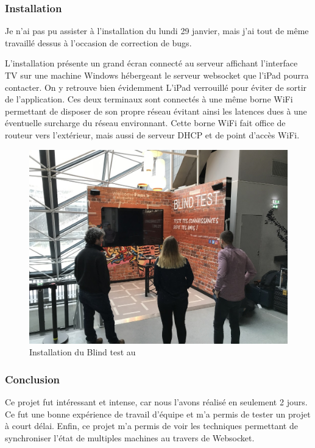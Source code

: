 \subsubsection{Installation}

Je n'ai pas pu assister à l'installation du lundi 29 janvier, mais j'ai tout de même travaillé dessus à l'occasion de correction de bugs.

L'installation présente un grand écran connecté au serveur affichant l'interface TV sur une machine Windows hébergeant le serveur websocket que l'iPad pourra contacter.
On y retrouve bien évidemment L'iPad verrouillé pour éviter de sortir de l'application.
Ces deux terminaux sont connectés à une même borne WiFi permettant de disposer de son propre réseau évitant ainsi les latences dues à une éventuelle surcharge du réseau environnant.
Cette borne WiFi fait office de routeur vers l'extérieur, mais aussi de serveur DHCP et de point d'accès WiFi.

\begin{figure}[h]
    \centering
    \includegraphics[scale=0.4]{img/accorhotel-blindtest-resize.jpg}
    \caption{Installation du Blind test au \aha}
\end{figure}

\subsubsection{Conclusion}

Ce projet fut intéressant et intense, car nous l'avons réalisé en seulement 2 jours.
Ce fut une bonne expérience de travail d'équipe et m'a permis de tester un projet à court délai.
Enfin, ce projet m'a permis de voir les techniques permettant de synchroniser l'état de multiples machines au travers de Websocket.
